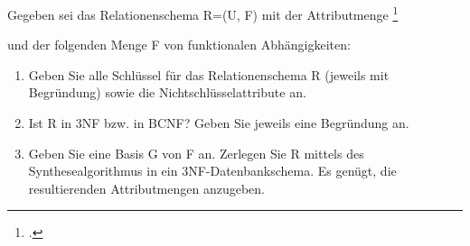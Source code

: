 \documentclass{bschlangaul-aufgabe}
\begin{document}

\let\FA=\liFunktionaleAbhaengigkeiten

Gegeben sei das Relationenschema R=(U, F) mit der Attributmenge
\footcite{examen:66116:2015:03}

\begin{center}
\end{center}

und der folgenden Menge F von funktionalen Abhängigkeiten:

\begin{center}

\FA{
  A -> B;
  A, B, C -> D;
  D -> B, C;
}
\end{center}

\begin{enumerate}


\item Geben Sie alle Schlüssel für das Relationenschema R (jeweils mit
Begründung) sowie die Nichtschlüsselattribute an.


\item Ist R in 3NF bzw. in BCNF? Geben Sie jeweils eine Begründung an.


\item Geben Sie eine Basis G von F an. Zerlegen Sie R mittels des
Synthesealgorithmus in ein 3NF-Datenbankschema. Es genügt, die
resultierenden Attributmengen anzugeben.
\end{enumerate}
\end{document}
